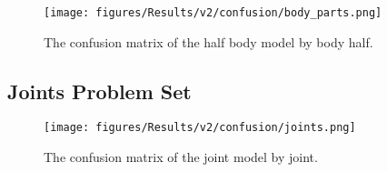 \begin{figure}[ht]
  \centering
  \texttt{[image: figures/Results/v2/confusion/body\_parts.png]}
  \caption[Half Body Model Confusion Matrix by Body Half]{The confusion matrix of the half body model by body half.}
  \label{fig:conf_v2_bp}
\end{figure}

\subsection{Joints Problem Set}



\begin{figure}[ht]
  \centering
  \texttt{[image: figures/Results/v2/confusion/joints.png]}
  \caption[Joint Model Confusion Matrix by Joint]{The confusion matrix of the joint model by joint.}
  \label{fig:conf_v2_bp}
\end{figure}